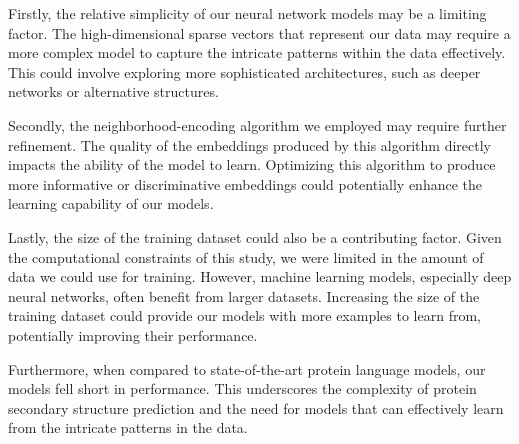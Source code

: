 Firstly, the relative simplicity of our neural network models may be a limiting factor. The high-dimensional sparse vectors that represent our data may require a more complex model to capture the intricate patterns within the data effectively. This could involve exploring more sophisticated architectures, such as deeper networks or alternative structures.

Secondly, the neighborhood-encoding algorithm we employed may require further refinement. The quality of the embeddings produced by this algorithm directly impacts the ability of the model to learn. Optimizing this algorithm to produce more informative or discriminative embeddings could potentially enhance the learning capability of our models.

Lastly, the size of the training dataset could also be a contributing factor. Given the computational constraints of this study, we were limited in the amount of data we could use for training. However, machine learning models, especially deep neural networks, often benefit from larger datasets. Increasing the size of the training dataset could provide our models with more examples to learn from, potentially improving their performance.

Furthermore, when compared to state-of-the-art protein language models, our models fell short in performance. This underscores the complexity of protein secondary structure prediction and the need for models that can effectively learn from the intricate patterns in the data.
